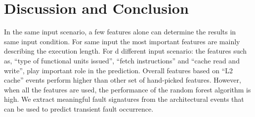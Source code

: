\documentclass{sig-alternate}
\begin{document}
\section{Discussion and Conclusion}
In the same input scenario, a few features alone can determine the results in same input condition. For same input the most important features are mainly describing the execution length. For d different input scenario: the features such as, “type of functional units issued”, “fetch instructions” and “cache read and write”, play important role in the prediction. Overall features based on “L2 cache” events perform higher than other set of hand-picked features. However, when all the features are used, the performance of the random forest algorithm is high. We extract meaningful fault signatures from the architectural events that can be used to predict transient fault occurrence.





\end{document}
